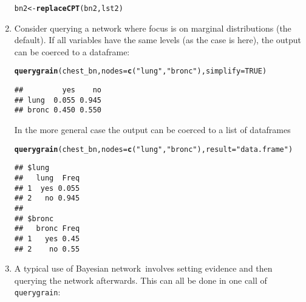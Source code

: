 \documentclass[10pt]{article}\usepackage[]{graphicx}\usepackage[]{xcolor}
\makeatletter
\newcommand{\hlnum}[1]{\textcolor[rgb]{0.686,0.059,0.569}{#1}}%
\newcommand{\hlstr}[1]{\textcolor[rgb]{0.192,0.494,0.8}{#1}}%
\newcommand{\hlstd}[1]{\textcolor[rgb]{0.345,0.345,0.345}{#1}}%
\newcommand{\hlkwb}[1]{\textcolor[rgb]{0.69,0.353,0.396}{#1}}%
\newcommand{\hlkwc}[1]{\textcolor[rgb]{0.333,0.667,0.333}{#1}}%
\newcommand{\hlkwd}[1]{\textcolor[rgb]{0.737,0.353,0.396}{\textbf{#1}}}%
\newenvironment{kframe}{%
 \def\at@end@of@kframe{}%
 \ifinner\ifhmode%
  \def\at@end@of@kframe{\end{minipage}}%
  \begin{minipage}{\columnwidth}%
 \fi\fi%
 \def\FrameCommand##1{\hskip\@totalleftmargin \hskip-\fboxsep
 \colorbox{shadecolor}{##1}\hskip-\fboxsep
     \hskip-\linewidth \hskip-\@totalleftmargin \hskip\columnwidth}%
 \MakeFramed {\advance\hsize-\width
   \@totalleftmargin\z@ \linewidth\hsize
   \@setminipage}}%
 {\par\unskip\endMakeFramed%
 \at@end@of@kframe}
\newenvironment{knitrout}{}{} %
\def\code#1{{\texttt{#1}}}
\def\bn{Bayesian network}
\makeatother
\begin{document}
\begin{enumerate}
\begin{knitrout}
\begin{kframe}
\begin{alltt}
\hlstd{bn2} \hlkwb{<-} \hlkwd{replaceCPT}\hlstd{(bn2, lst2)}
\end{alltt}
\end{kframe}
\end{knitrout}

\item Consider querying a network where focus is on 
  marginal distributions (the default). If all variables have the same
  levels (as the case is here), the output can be coerced to a
  dataframe:

\begin{knitrout}
\color{fgcolor}\begin{kframe}
\begin{alltt}
\hlkwd{querygrain}\hlstd{(chest_bn,} \hlkwc{nodes}\hlstd{=}\hlkwd{c}\hlstd{(}\hlstr{"lung"}\hlstd{,} \hlstr{"bronc"}\hlstd{),} \hlkwc{simplify} \hlstd{=} \hlnum{TRUE}\hlstd{)}
\end{alltt}
\begin{verbatim}
##         yes    no
## lung  0.055 0.945
## bronc 0.450 0.550
\end{verbatim}
\end{kframe}
\end{knitrout}

In the more general case the output can be coerced to a list of dataframes
\begin{knitrout}
\color{fgcolor}\begin{kframe}
\begin{alltt}
\hlkwd{querygrain}\hlstd{(chest_bn,} \hlkwc{nodes}\hlstd{=}\hlkwd{c}\hlstd{(}\hlstr{"lung"}\hlstd{,} \hlstr{"bronc"}\hlstd{),} \hlkwc{result}\hlstd{=}\hlstr{"data.frame"}\hlstd{)}
\end{alltt}
\begin{verbatim}
## $lung
##   lung  Freq
## 1  yes 0.055
## 2   no 0.945
## 
## $bronc
##   bronc Freq
## 1   yes 0.45
## 2    no 0.55
\end{verbatim}
\end{kframe}
\end{knitrout}

\item A typical use of \bn\ involves setting evidence and then querying the network afterwards. This can all be done in one call of \code{querygrain}:


\end{enumerate}
\end{document}
